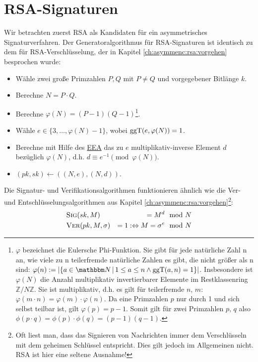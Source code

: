 \section{RSA-Signaturen}\label{sec:rsa}\indexRSA
 Wir betrachten zuerst RSA als
Kandidaten für ein asymmetrisches Signaturverfahren. Der
Generatoralgorithmus für RSA-Signaturen ist identisch zu dem für
RSA-Verschlüsselung, der in Kapitel \ref{ch:asymmenc:rsa:vorgehen}
besprochen wurde:
\begin{itemize}
\item Wähle zwei große Primzahlen $P, Q$ mit $P \neq Q$ und
  vorgegebener Bitlänge $k$.
\item Berechne $N = P \cdot Q$.
\item Berechne $\varphi(N) = (P - 1)(Q - 1)$\footnote{$\varphi$
    bezeichnet die Eulersche Phi-Funktion. Sie gibt für jede natürliche Zahl
    n an, wie viele zu n teilerfremde natürliche Zahlen es gibt, die nicht
    größer als n sind: $\varphi(n) := \vert \{a\in\N \, |\, 1 \le a \le n
    \land \operatorname{ggT}(a,n) = 1 \} \vert$. Insbesondere ist
    $\varphi(N)$ die Anzahl multiplikativ invertierbarer Elemente im
    Restklassenring $\mathbb{Z}/N\mathbb{Z}$.  Sie ist multiplikativ,
    d.h. es gilt für teilerfremde $n$, $m$: $\varphi(m\cdot n) = \varphi(m)
    \cdot \varphi(n)$. Da eine Primzahlen $p$ nur durch 1 und sich selbst
    teilbar ist, gilt $\varphi(p) = p-1$. Somit gilt für zwei Primzahlen
    $p$, $q$ also $\phi(p \cdot q) = \phi(p) \cdot \phi(q) = (p-1)(q-1)$.}.
\item Wähle $e \in \{3, \dotsc, \varphi(N) - 1\}$, wobei
  $\operatorname{ggT}(e, \varphi(N)) = 1$.
\item Berechne mit Hilfe des \hyperref[ssec:eea]{EEA} das zu $e$
  multiplikativ-inverse Element $d$ bezüglich $\varphi(N)$, d.h. $d \equiv
  e^{-1} \pmod{\varphi(N)}$.
\item $(pk, sk)\leftarrow ((N,e), (N,d))$.
\end{itemize} Die Signatur- und Verifikationsalgorithmen funktionieren
ähnlich wie die Ver- und Entschlüsselungsalgorithmen aus Kapitel
\ref{ch:asymmenc:rsa:vorgehen}\footnote{Oft liest man, dass das
  Signieren von Nachrichten immer dem Verschlüsseln mit dem geheimen
  Schlüssel entspricht. Dies gilt jedoch im Allgemeinen nicht. RSA ist
  hier eine seltene Ausnahme!}:
\begin{alignat*}{3} & \textsc{Sig}(sk, M) & = M^d & \mod N\\ &
  \textsc{Ver}(pk, M, \sigma) & = 1 : \Leftrightarrow M = \sigma^e
  & \mod N
\end{alignat*}


